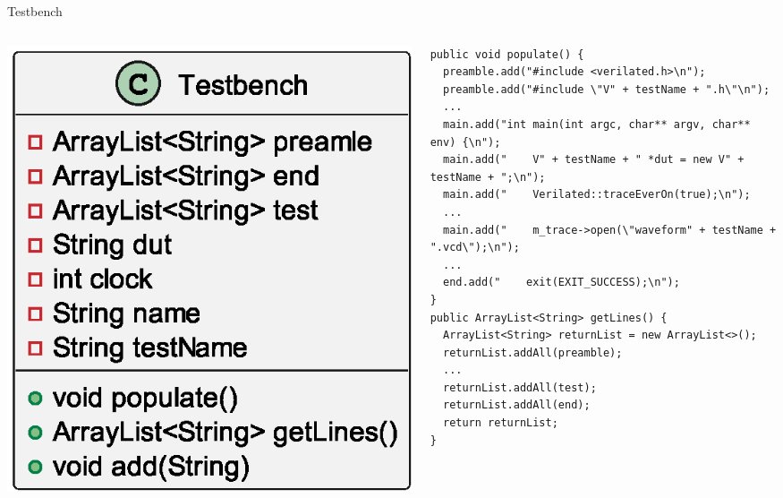\documentclass[aspectratio=169, handout]{beamer}
\begin{document}
\begin{frame}[containsverbatim]{Testbench}
    \begin{columns}[T]
        \begin{column}{.2\textwidth}
            \includegraphics[width=\columnwidth]{out/plantuml/TestbenchClass/TestbenchClass.eps}
        \end{column}
        \begin{column}{.8\textwidth}
            \begin{verbatim}
public void populate() {
  preamble.add("#include <verilated.h>\n");
  preamble.add("#include \"V" + testName + ".h\"\n");
  ...
  main.add("int main(int argc, char** argv, char** env) {\n");
  main.add("    V" + testName + " *dut = new V" + testName + ";\n");
  main.add("    Verilated::traceEverOn(true);\n");
  ...
  main.add("    m_trace->open(\"waveform" + testName + ".vcd\");\n");
  ...
  end.add("    exit(EXIT_SUCCESS);\n");
}
public ArrayList<String> getLines() {
  ArrayList<String> returnList = new ArrayList<>();
  returnList.addAll(preamble);
  ...
  returnList.addAll(test);
  returnList.addAll(end);
  return returnList;
}
            \end{verbatim}
        \end{column}
    \end{columns}
\end{frame}
\end{document}
